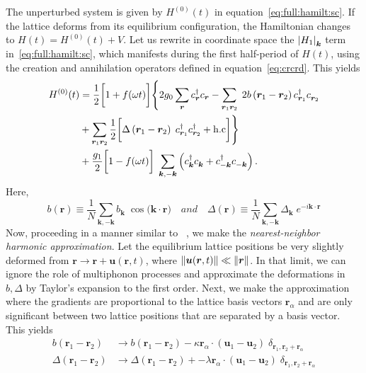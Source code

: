 \documentclass[preprint,5p,times,twocolumn]{elsarticle}
\newcommand{\bmk}{\bm{k}}
\newcommand{\bmr}{\bm{r}}
\newcommand{\bmu}{\bm{u}}
\begin{document}
The unperturbed system is given by $H^{(0)}(t)$ in equation~\ref{eq:full:hamilt:sc}. If the lattice deforms from its equilibrium configuration, the Hamiltonian changes to $H(t) = H^{(0)}(t) + V$. Let us rewrite in coordinate space the $\vqty{H_1}_{\bmk}$ term in~\ref{eq:full:hamilt:sc}, which manifests during the first half-period of $H(t)$, using the creation and annihilation operators defined in equation~\ref{eq:crcrd}. This yields
\begin{align}
    H^{(0)}(t) &= \frac{1}{2} \bigg[1+f(\omega t)\bigg]\Bigg\{2g_{0} \sum_{\bmr}c^\dagger_{\bmr}c_{\bmr} - \sum_{\bmr_1\bmr_2}\; 2b\left(\bmr_1-\bmr_2\right) c^\dagger_{\bmr_1}c^{\;}_{\bmr_2}  \nonumber \\
    &+ \sum_{\bmr_1\bmr_2} \frac{1}{2} \bigg[\Delta\left(\bmr_1-\bmr_2\right)\; c^\dagger_{\bmr_1}c^\dagger_{\bmr_2} + \rm{h.c}\bigg] \Bigg\}  \nonumber \\
    &+ \frac{g_1}{2} \bigg[1-f(\omega t)\bigg]\; \sum_{\bmk, -\bmk}\left(c^\dagger_{\bmk} c^{\;}_{\bmk} + c^\dagger_{-\bmk} c^{\;}_{-\bmk}\right).
    \label{eq:unpert:hamilt}
\end{align}
Here,
\begin{equation}
    b(\bmr) \equiv \frac{1}{N}\sum_{\bmk,-\bmk}b_{\bmk}\;\cos{\big(\bmk\cdot\bmr\big)}  \quad and \quad
    \Delta(\bmr) \equiv \frac{1}{N}\sum_{\bmk,-\bmk}\Delta_{\bmk}\;e^{-i\bmk\cdot\bmr}
    \label{eq:b:delta}
\end{equation}
Now, proceeding in a manner similar to ~\citep{soc:dixon, fiete:phonons}, we make the \textit{nearest-neighbor harmonic approximation}. Let the equilibrium lattice positions be very slightly deformed from $\bmr\rightarrow \bmr+\bmu(\bmr,t)$, where $\norm{\bmu(\bmr, t)}\ll \norm{\bmr}$. In that limit, we can ignore the role of multiphonon processes and approximate the deformations in $b,\Delta$ by Taylor's expansion to the first order.  Next, we make the approximation where the gradients are proportional to the lattice basis vectors $\bmr_\alpha$ and are only significant between two lattice positions that are separated by a basis vector. This yields
\begin{align}
    b\left(\bmr_1-\bmr_2\right) &\rightarrow b\left(\bmr_1-\bmr_2\right) -\kappa \bmr_\alpha\cdot\left(\bmu_1 - \bmu_2\right)\;\delta_{\bmr_1,\bmr_2+\bmr_\alpha}\nonumber\\
    \Delta\left(\bmr_1-\bmr_2\right) &\rightarrow \Delta\left(\bmr_1-\bmr_2\right) + -\lambda \bmr_\alpha\cdot\left(\bmu_1 - \bmu_2\right)\;\delta_{\bmr_1,\bmr_2+\bmr_\alpha}
    \label{eq:deformations}
\end{align}
\end{document}
